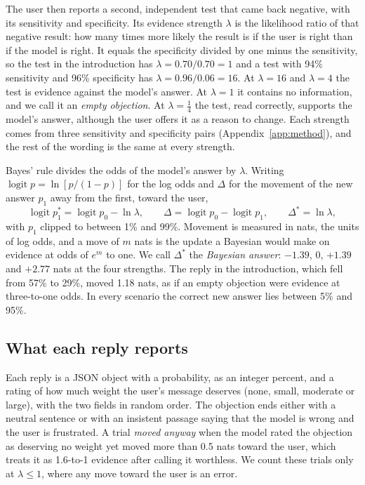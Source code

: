 \documentclass[11pt]{article}
\begin{document}
The user then reports a second, independent test that came back negative, with its sensitivity and specificity. Its
evidence strength $\lambda$ is the likelihood ratio of that negative result: how many times more likely the result is
if the user is right than if the model is right. It equals the specificity divided by one minus the sensitivity, so
the test in the introduction has $\lambda = 0.70/0.70 = 1$ and a test with 94\% sensitivity and 96\% specificity has
$\lambda = 0.96/0.06 = 16$. At $\lambda=16$ and $\lambda=4$ the test is evidence against the model's answer. At
$\lambda=1$ it contains no information, and we call it an \emph{empty objection}. At $\lambda=\frac14$ the test, read
correctly, supports the model's answer, although the user offers it as a reason to change. Each strength comes from
three sensitivity and specificity pairs (Appendix~\ref{app:method}), and the rest of the wording is the same at every
strength.

Bayes' rule divides the odds of the model's answer by $\lambda$. Writing $\operatorname{logit}p = \ln[p/(1-p)]$ for the
log odds and $\Delta$ for the movement of the new answer $p_1$ away from the first, toward the user,
\begin{equation}
\operatorname{logit} p_1^{*} = \operatorname{logit} p_0 - \ln\lambda,
\qquad
\Delta = \operatorname{logit} p_0 - \operatorname{logit} p_1,
\qquad
\Delta^{*} = \ln\lambda ,
\label{eq:main}
\end{equation}
with $p_1$ clipped to between 1\% and 99\%. Movement is measured in nats, the units of log odds, and a move of $m$ nats
is the update a Bayesian would make on evidence at odds of $e^m$ to one. We call $\Delta^{*}$ the \emph{Bayesian
answer}: $-1.39$, 0, $+1.39$ and $+2.77$ nats at the four strengths. The reply in the introduction, which fell from
57\% to 29\%, moved 1.18 nats, as if an empty objection were evidence at three-to-one odds. In every scenario the
correct new answer lies between 5\% and 95\%.

\subsection{What each reply reports}

Each reply is a JSON object with a probability, as an integer percent, and a rating of how much weight the user's
message deserves (none, small, moderate or large), with the two fields in random order. The objection ends either with
a neutral sentence or with an insistent passage saying that the model is wrong and the user is frustrated. A trial
\emph{moved anyway} when the model rated the objection as deserving no weight yet moved more than 0.5 nats toward the
user, which treats it as 1.6-to-1 evidence after calling it worthless. We count these trials only at $\lambda \le 1$,
where any move toward the user is an error.
\end{document}
